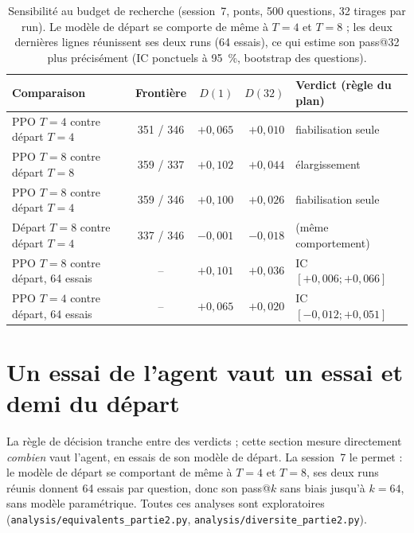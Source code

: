 \begin{table}[h]\centering\small
\begin{tabular}{>{\raggedright\arraybackslash}p{4.4cm}crrl}\toprule
Comparaison & Frontière & $D(1)$ & $D(32)$ & Verdict (règle du plan)\\\midrule
PPO $T = 4$ contre départ $T = 4$ & 351 / 346 & $+0{,}065$ & $+0{,}010$ & fiabilisation seule\\
PPO $T = 8$ contre départ $T = 8$ & 359 / 337 & $+0{,}102$ & $+0{,}044$ & élargissement\\
PPO $T = 8$ contre départ $T = 4$ & 359 / 346 & $+0{,}100$ & $+0{,}026$ & fiabilisation seule\\
Départ $T = 8$ contre départ $T = 4$ & 337 / 346 & $-0{,}001$ & $-0{,}018$ & (même comportement)\\
PPO $T = 8$ contre départ, 64 essais & -- & $+0{,}101$ & $+0{,}036$ & IC $[+0{,}006 ; +0{,}066]$\\
PPO $T = 4$ contre départ, 64 essais & -- & $+0{,}065$ & $+0{,}020$ & IC $[-0{,}012 ; +0{,}051]$\\\bottomrule
\end{tabular}
\caption{Sensibilité au budget de recherche (session~7, ponts, 500 questions, 32 tirages par run). Le modèle de départ se comporte de même à $T = 4$ et $T = 8$ ; les deux dernières lignes réunissent ses deux runs (64 essais), ce qui estime son pass@32 plus précisément (IC ponctuels à 95~\%, bootstrap des questions).}\label{tab:budget}
\end{table}

\section{Un essai de l'agent vaut un essai et demi du départ}\label{sec:equivalents-p2}

La règle de décision tranche entre des verdicts ; cette section mesure directement \emph{combien} vaut l'agent, en essais de son modèle de départ. La session~7 le permet : le modèle de départ se comportant de même à $T = 4$ et $T = 8$, ses deux runs réunis donnent 64 essais par question, donc son pass@$k$ sans biais jusqu'à $k = 64$, sans modèle paramétrique. Toutes ces analyses sont exploratoires (\texttt{analysis/equivalents\_partie2.py}, \texttt{analysis/diversite\_partie2.py}).


